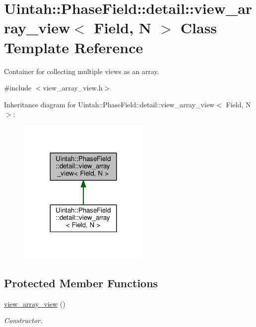 \hypertarget{classUintah_1_1PhaseField_1_1detail_1_1view__array__view}{}\section{Uintah\+:\+:Phase\+Field\+:\+:detail\+:\+:view\+\_\+array\+\_\+view$<$ Field, N $>$ Class Template Reference}
\label{classUintah_1_1PhaseField_1_1detail_1_1view__array__view}


Container for collecting multiple views as an array.  




{\ttfamily \#include $<$view\+\_\+array\+\_\+view.\+h$>$}



Inheritance diagram for Uintah\+:\+:Phase\+Field\+:\+:detail\+:\+:view\+\_\+array\+\_\+view$<$ Field, N $>$\+:\nopagebreak
\begin{figure}[H]
\begin{center}
\leavevmode
\includegraphics[width=180pt]{classUintah_1_1PhaseField_1_1detail_1_1view__array__view__inherit__graph}
\end{center}
\end{figure}
\subsection*{Protected Member Functions}
\begin{DoxyCompactItemize}
\item 
\hyperlink{classUintah_1_1PhaseField_1_1detail_1_1view__array__view_a589b669c4891443b68b5fd0424f46c3d}{view\+\_\+array\+\_\+view} ()
\begin{DoxyCompactList}\small\item\em Constructor. \end{DoxyCompactList}\end{DoxyCompactItemize}
